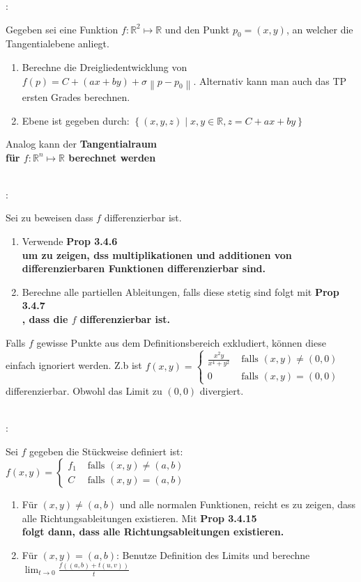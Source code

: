 \documentclass[7pt,landscape, margin = 0.1mm]{article}
\newcommand{\COL}[1]{ \color{chaptercolor} \bf{#1}\color{black}     \\}
\newcommand{\KRZ}[2]{\vspace{1mm} \hline \vspace{1mm} \color{chaptercolor}{RC #1}:\color{black} \   \hspace{0.2cm}\vspace{1mm}   {\begin{minipage}{20em}
#2 \end{minipage}} \vspace{1mm}  \hline \vspace{1mm}  \\}
\begin{document}
\begin{multicols}{4}
\begin{flushleft}
{}

\KRZ{Tangentialebene}{
Gegeben sei eine Funktion $f: \mathbb{R}^2 \mapsto \mathbb{R}$ und den Punkt $p_0=(x,y)$, an welcher die Tangentialebene anliegt.

\begin{enumerate}
\item Berechne die Dreigliedentwicklung von $f(p)= C + (ax + by) + \sigma\left\| p - p_0\right\|$. Alternativ kann man auch das TP ersten Grades berechnen.
\item Ebene ist gegeben durch: 
$ \left\{ (x,y,z) \mid x,y \in \mathbb{R}, z = C + ax+by   \right\} $
\end{enumerate}
Analog kann der \COL{Tangentialraum} für $f: \mathbb{R}^n \mapsto \mathbb{R}$ berechnet werden
}

\KRZ{Beweise Differenzierbarkeit}{
Sei zu beweisen dass $f$ differenzierbar ist. 
\begin{enumerate}
\item Verwende \COL{Prop 3.4.6} um zu zeigen, dss multiplikationen und additionen von differenzierbaren Funktionen differenzierbar sind. 
\item Berechne alle partiellen Ableitungen, falls diese stetig sind folgt mit \COL{Prop 3.4.7}, dass die $f$ differenzierbar ist. 
\end{enumerate}
Falls $f$ gewisse Punkte aus dem Definitionsbereich exkludiert, können diese einfach ignoriert werden. Z.b ist $f(x, y)= \begin{cases}\frac{x^2 y}{x^4+y^2} & \text { falls }(x, y) \neq(0,0) \\ 0 & \text { falls }(x, y)=(0,0)\end{cases} $ differenzierbar. Obwohl das Limit zu $(0,0)$ divergiert.
}

\KRZ{Beweise Existenz von Richtungsableitungen}{
Sei $f$ gegeben die Stückweise definiert ist: 
$f(x, y)= \begin{cases} f_1 & \text { falls }(x, y) \neq(a,b) \\ C & \text { falls }(x, y)=(a,b)\end{cases} $
\begin{enumerate}
\item Für $(x,y)\neq(a,b)$ und alle normalen Funktionen, reicht es zu zeigen, dass alle Richtungsableitungen existieren. Mit \COL{Prop 3.4.15} folgt dann, dass alle Richtungsableitungen existieren.
\item Für $(x,y)=(a,b)$: Benutze Definition des  Limits und berechne $\lim_{t\to 0}\frac{f ((a,b)+t(u,v))}{t}$
\end{enumerate}
}


\end{flushleft}
\end{multicols}
\end{document}
